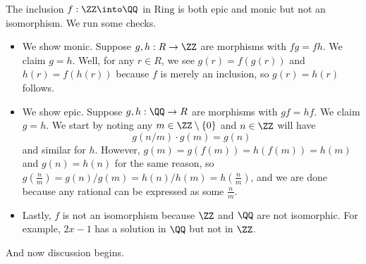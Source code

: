 \documentclass[../notes.tex]{subfiles}
\begin{document}
\begin{ex}
	The inclusion $f:\ZZ\into\QQ$ in $\mathrm{Ring}$ is both epic and monic but not an isomorphism. We run some checks.
	\begin{itemize}
		\item We show monic. Suppose $g,h:R\to\ZZ$ are morphisms with $fg=fh.$ We claim $g=h$. Well, for any $r\in R$, we see $g(r)=f(g(r))$ and $h(r)=f(h(r))$ because $f$ is merely an inclusion, so $g(r)=h(r)$ follows.
		\item We show epic. Suppose $g,h:\QQ\to R$ are morphisms with $gf=hf$. We claim $g=h$. We start by noting any $m\in\ZZ\setminus\{0\}$ and $n\in\ZZ$ will have
		\[g\left(n/m\right)\cdot g(m)=g(n)\]
		and similar for $h$. However, $g(m)=g(f(m))=h(f(m))=h(m)$ and $g(n)=h(n)$ for the same reason, so $g\left(\frac nm\right)=g(n)/g(m)=h(n)/h(m)=h\left(\frac nm\right)$, and we are done because any rational can be expressed as some $\frac nm$.
		\item Lastly, $f$ is not an isomorphism because $\ZZ$ and $\QQ$ are not isomorphic. For example, $2x-1$ has a solution in $\QQ$ but not in $\ZZ$.
	\end{itemize}
\end{ex}
And now discussion begins.
\end{document}
